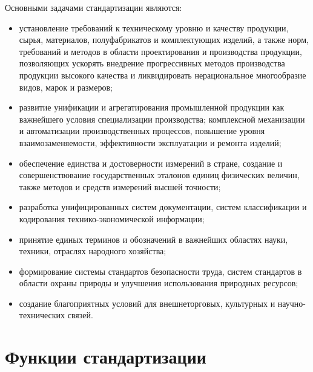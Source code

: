 Основными задачами стандартизации являются:
\begin{itemize}
\item установление требований к техническому уровню и качеству продукции, сырья, материалов, полуфабрикатов и комплектующих изделий, а также норм, требований и методов в области проектирования и производства продукции, позволяющих ускорять внедрение прогрессивных методов производства продукции высокого качества и ликвидировать нерациональное многообразие видов, марок и размеров;
\item развитие унификации и агрегатирования промышленной продукции как важнейшего условия специализации производства; комплексной механизации и автоматизации производственных процессов, повышение уровня взаимозаменяемости, эффективности эксплуатации и ремонта изделий;
\item обеспечение единства и достоверности измерений в стране, создание и совершенствование государственных эталонов единиц физических величин, также методов и средств измерений высшей точности;
\item разработка унифицированных систем документации, систем классификации и кодирования технико-экономической информации;
\item принятие единых терминов и обозначений в важнейших областях науки, техники, отраслях народного хозяйства;
\item формирование системы стандартов безопасности труда, систем стандартов в области охраны природы и улучшения использования природных ресурсов;
\item создание благоприятных условий для внешнеторговых, культурных и научно-технических связей.
\end{itemize}

\section{Функции стандартизации}

